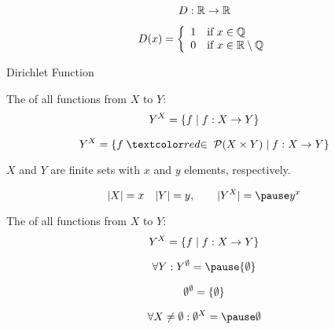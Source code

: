 \begin{frame}{}
  \[
    D: \mathbb{R}{} \to \mathbb{R}{}
  \]

  \[
    D(x) = \left\{\begin{array}{ll}
      1 & \text{if } x \in \mathbb{Q} \\
      0 & \text{if } x \in \mathbb{R} \setminus \mathbb{Q} 
    \end{array}\right.
  \]

  \vspace{0.60cm}
  \centerline{Dirichlet Function}
\end{frame}

% 
% 

\begin{frame}
  \begin{definition}
    The  of all functions from $X$ to $Y$:
    \[
      Y^{X} = \{f \mid f: X \to Y\}
    \]
  \end{definition}

  \pause
  \[
    Y^{X} = \set{f \;\red{\in\; \ps{X \times Y}} \mid f: X \to Y}
  \]

  \pause
  \vspace{0.50cm}
  \begin{center}
    $X$ and $Y$ are finite sets with $x$ and $y$ elements, respectively.
  \end{center}
  \[
    |X| = x \quad |Y| = y, \qquad |Y^{X}| = \pause y^{x}
  \]
\end{frame}

\begin{frame}
  \begin{definition}
    The  of all functions from $X$ to $Y$:
    \[
      Y^{X} = \{f \mid f: X \to Y\}
    \]
  \end{definition}

  \[
    \forall Y: Y^{\emptyset} = \pause \set{\emptyset}
  \]

  \pause
  \vspace{-0.30cm}
  \[
    \emptyset^{\emptyset} = \{\emptyset\}
  \]

  \pause
  \[
    \forall X \neq \emptyset: \emptyset^{X} = \pause \emptyset
  \]
\end{frame}


